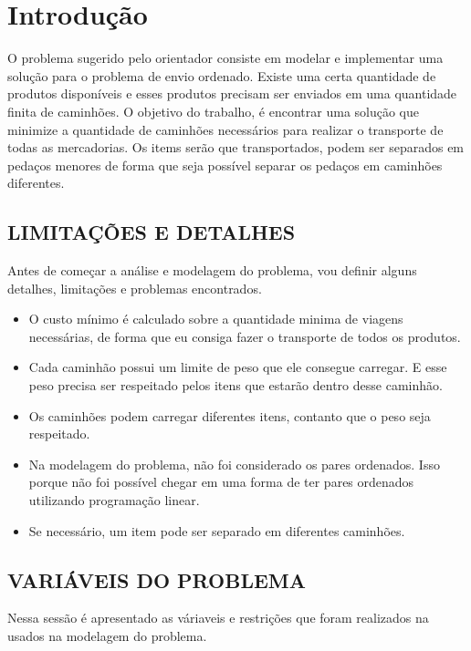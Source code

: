 \chapter{Introdução}


O problema sugerido pelo orientador consiste em modelar e implementar uma solução para o problema de envio ordenado. Existe uma certa quantidade de produtos disponíveis e esses produtos precisam ser enviados em uma quantidade finita de caminhões. O objetivo do trabalho, é encontrar uma solução que minimize a quantidade de caminhões necessários para realizar o transporte de todas as mercadorias. Os items serão que transportados, podem ser separados em pedaços menores de forma que seja possível separar os pedaços em caminhões diferentes. 

\section{LIMITAÇÕES E DETALHES}
  Antes de começar a análise e modelagem do problema, vou definir alguns detalhes, limitações e problemas encontrados. 
  \begin{itemize}
    \item O custo mínimo é calculado sobre a quantidade minima de viagens necessárias, de forma que eu consiga fazer o transporte de todos os produtos. 
    \item Cada caminhão possui um limite de peso que ele consegue carregar. E esse peso precisa ser respeitado pelos itens que estarão dentro desse caminhão. 
    \item Os caminhões podem carregar diferentes itens, contanto que o peso seja respeitado. 
    \item Na modelagem do problema, não foi considerado os pares ordenados. Isso porque não foi possível chegar em uma forma de ter pares ordenados utilizando programação linear.
    \item Se necessário, um item pode ser separado em diferentes caminhões.
  \end{itemize}

\section{VARIÁVEIS DO PROBLEMA}
  Nessa sessão é apresentado as váriaveis e restrições que foram realizados na usados na modelagem do problema.


